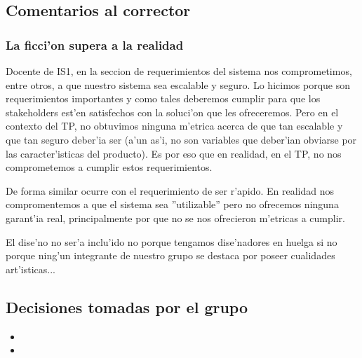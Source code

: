 \subsection{Comentarios al corrector}
\subsubsection{La ficci'on supera a la realidad}
Docente de IS1, en la seccion de requerimientos del sistema nos comprometimos, entre otros, a que nuestro sistema sea escalable y seguro. Lo hicimos porque son requerimientos importantes y como tales deberemos cumplir para que los stakeholders est'en satisfechos con la soluci'on que les ofreceremos. Pero en el contexto del TP, no obtuvimos ninguna m'etrica acerca de que tan escalable y que tan seguro deber'ia ser (a'un as'i, no son variables que deber'ian obviarse por las caracter'isticas del producto). Es por eso que en realidad, en el TP, no nos comprometemos a cumplir estos requerimientos. 

De forma similar ocurre con el requerimiento de ser r'apido. En realidad nos compromentemos a que el sistema sea ''utilizable'' pero no ofrecemos ninguna garant'ia real, principalmente por que no se nos ofrecieron m'etricas a cumplir.

El dise'no no ser'a inclu'ido no porque tengamos dise'nadores en huelga si no porque ning'un integrante de nuestro grupo se destaca por poseer cualidades art'isticas...




\subsection{Decisiones tomadas por el grupo}
\begin{itemize}
\item 
\item 

\end{itemize}
